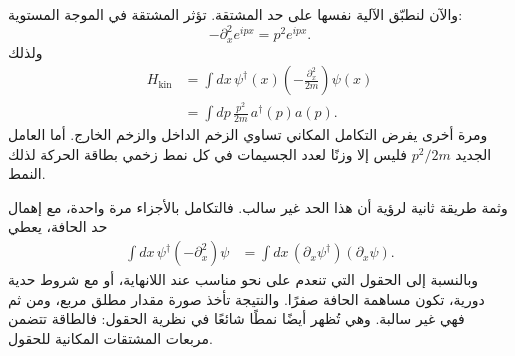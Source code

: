 والآن لنطبّق الآلية نفسها على حد المشتقة. تؤثر المشتقة في الموجة المستوية:
\begin{equation}
-\partial_x^2 e^{ipx}=p^2e^{ipx}.
\end{equation}
ولذلك
\begin{align}
H_{\mathrm{kin}}
&=\int dx\,\psi^\dagger(x)
\left(-\frac{\partial_x^2}{2m}\right)\psi(x)\\
&=\int dp\,\frac{p^2}{2m}\,a^\dagger(p)a(p).
\label{eq:l9-kinetic-momentum}
\end{align}
ومرة أخرى يفرض التكامل المكاني تساوي الزخم الداخل والزخم الخارج. أما العامل الجديد \(p^2/2m\) فليس إلا وزنًا لعدد الجسيمات في كل نمط زخمي بطاقة الحركة لذلك النمط.

\begin{classroomqa}
\end{classroomqa}

\begin{classroomqa}
\end{classroomqa}

\begin{classroomqa}
\end{classroomqa}

وثمة طريقة ثانية لرؤية أن هذا الحد غير سالب. فالتكامل بالأجزاء مرة واحدة، مع إهمال حد الحافة، يعطي
\begin{align}
\int dx\,\psi^\dagger(-\partial_x^2)\psi
&=\int dx\,(\partial_x\psi^\dagger)(\partial_x\psi).
\label{eq:l9-positive-kinetic}
\end{align}
وبالنسبة إلى الحقول التي تنعدم على نحو مناسب عند اللانهاية، أو مع شروط حدية دورية، تكون مساهمة الحافة صفرًا. والنتيجة تأخذ صورة مقدار مطلق مربع، ومن ثم فهي غير سالبة. وهي تُظهر أيضًا نمطًا شائعًا في نظرية الحقول: فالطاقة تتضمن مربعات المشتقات المكانية للحقول.

